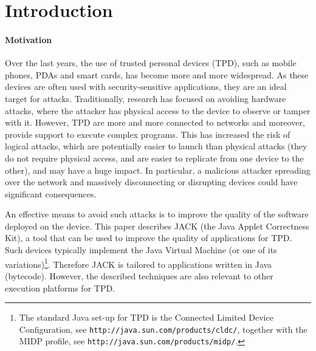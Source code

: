 \section{Introduction}\label{SecIntro}

\paragraph{Motivation}

Over the last years, the use of trusted personal devices (TPD), such
as mobile phones, PDAs and smart cards, has become more and more
widespread. As these devices are often used with security-sensitive
applications, they are an ideal target for attacks. Traditionally,
research has focused on avoiding hardware attacks, where the attacker
has physical access to the device to observe or tamper with
it. However, TPD are more and more connected to networks and moreover,
provide support to execute complex programs. This has increased the
risk of logical attacks, which are potentially easier to launch than
physical attacks (they do not require physical access, and are easier
to replicate from one device to the other), and may have a huge
impact.  In particular, a malicious attacker spreading over the
network and massively disconnecting or disrupting devices could have
significant consequences.

An effective means to avoid such attacks is to improve the quality of
the software deployed on the device. %
This paper describes JACK (the Java Applet Correctness Kit), a tool
that can be used to improve the quality of applications for TPD. Such
devices typically implement the Java Virtual Machine (or one of its
variations)\footnote{The standard Java set-up for TPD is the Connected
Limited Device Configuration, see 
\texttt{http://java.sun.com/products/cldc/}, together with the MIDP
profile, see \texttt{http://java.sun.com/products/midp/}.}. Therefore
JACK is tailored to applications written in Java (bytecode). However,
the described techniques are also relevant to other execution
platforms for TPD.



